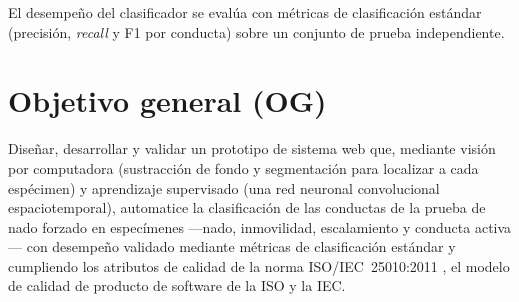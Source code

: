 El desempeño del clasificador se evalúa con métricas de clasificación estándar
(precisión, \textit{recall} y F1 por conducta) sobre un conjunto de prueba independiente.

\section{Objetivo general (OG)}

Diseñar, desarrollar y validar un prototipo de sistema web que, mediante visión por
computadora (sustracción de fondo y segmentación para localizar a cada espécimen) y
aprendizaje supervisado (una red neuronal convolucional espaciotemporal), automatice la
clasificación de las conductas de la prueba de nado forzado en especímenes
---nado, inmovilidad, escalamiento y conducta activa--- con
desempeño validado mediante métricas de clasificación estándar y cumpliendo los
atributos de calidad de la norma ISO/IEC~25010:2011 \cite{iso25010}, el modelo de
calidad de producto de software de la ISO y la IEC.

